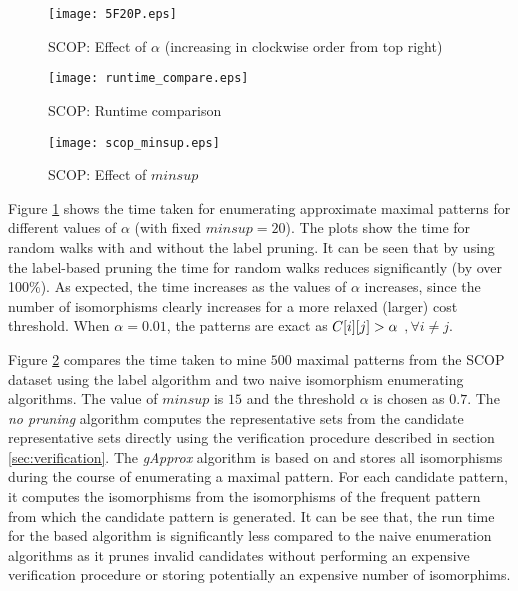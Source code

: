 \begin{figure}[!ht]
	\centerline{
    \texttt{[image: 5F20P.eps]}
	}
	\caption{SCOP: Effect of $\alpha$ (increasing in 
	clockwise order from top right)}
    \label{fig:5F20P}
\end{figure}

\begin{figure}[!ht]
  \centerline{
    \texttt{[image: runtime\_compare.eps]}
	}
    \caption{SCOP: Runtime comparison}
    \label{fig:runtime}
\end{figure}

\begin{figure}[!ht]
  \centerline{
    \texttt{[image: scop\_minsup.eps]}
	}
	\caption{SCOP: Effect of $minsup$}
    \label{fig:5F20P_ft}
\end{figure}


\smallskip{}
Figure \ref{fig:5F20P} shows the time taken for enumerating approximate
maximal patterns for different values of $\alpha$ (with fixed $minsup =
20$). The plots show the time for random walks with and without the
label pruning. It can be seen that by using the label-based pruning the
time for random walks reduces significantly (by over 100\%).  As
expected, the time increases as the values of $\alpha$ increases, since
the number of isomorphisms clearly increases for a more relaxed (larger)
cost threshold.  When $\alpha = 0.01$, the patterns are exact as
${C}[i][j] > \alpha$ $,\forall i \neq j$.

Figure \ref{fig:runtime} compares the time taken to mine $500$
maximal patterns from the SCOP dataset using the \ncl label algorithm
and two naive isomorphism enumerating algorithms. 
The value of $minsup$ is $15$ and
the threshold $\alpha$ is chosen as $0.7$.
The \textit{no pruning}
algorithm computes the representative sets from the candidate representative
sets directly using the verification procedure described in
section \ref{sec:verification}. The \textit{gApprox} algorithm is based on
\cite{gapprox} and stores all isomorphisms during the course of enumerating
a maximal pattern. For each candidate pattern, it computes the isomorphisms
from the isomorphisms of the frequent pattern from which the candidate 
pattern is generated. It can be see that, the run time for the \ncl based 
algorithm is significantly less compared to the naive enumeration algorithms 
as it prunes invalid candidates without performing an expensive verification
procedure or storing potentially an expensive number of isomorphims.


